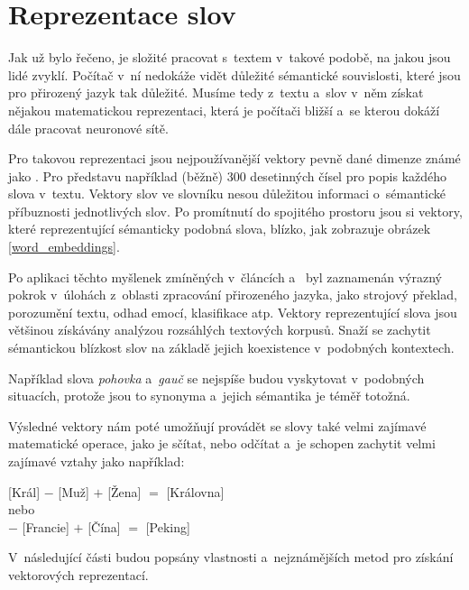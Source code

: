 \section{Reprezentace slov}
\label{reprezentace_slov}
Jak už bylo řečeno, je složité pracovat s~textem v~takové podobě, na jakou jsou lidé zvyklí. Počítač v~ní nedokáže vidět důležité sémantické souvislosti, které jsou pro přirozený jazyk tak důležité. Musíme tedy z~textu a~slov v~něm získat nějakou matematickou reprezentaci, která je počítači bližší a~se kterou dokáží dále pracovat neuronové sítě. \par
Pro takovou reprezentaci jsou nejpoužívanější vektory pevně dané dimenze známé jako . Pro představu například (běžně) 300 desetinných čísel pro popis každého slova v~textu. Vektory slov ve slovníku nesou důležitou informaci o~sémantické příbuznosti jednotlivých slov. Po promítnutí do spojitého prostoru jsou si vektory, které reprezentující sémanticky podobná slova, blízko, jak zobrazuje obrázek \ref{word_embeddings}.\par
Po aplikaci těchto myšlenek zmíněných v~článcích \cite{mikolov2013embeddings} a~\cite{mikolov2013_2} byl zaznamenán výrazný pokrok v~úlohách z~oblasti zpracování přirozeného jazyka, jako strojový překlad, porozumění textu, odhad emocí, klasifikace atp.
Vektory reprezentující slova jsou většinou získávány analýzou rozsáhlých textových korpusů. Snaží se zachytit sémantickou blízkost slov na základě jejich koexistence v~podobných kontextech.\par 
Například slova \emph{pohovka} a~\emph{gauč} se nejspíše budou vyskytovat v~podobných situacích, protože jsou to synonyma a~jejich sémantika je téměř totožná.\par
Výsledné vektory nám poté umožňují provádět se slovy také velmi zajímavé matematické operace, jako je sčítat, nebo odčítat a~je schopen zachytit velmi zajímavé vztahy jako například:
\begin{center}
[Král] $-$ [Muž] $+$ [Žena] $=$ [Královna]\\
\medskip
nebo\\
\medskip
[Paříž] $-$ [Francie] $+$ [Čína] $=$ [Peking]
\end{center}

V~následující části budou popsány vlastnosti a~nejznámějších metod pro získání vektorových reprezentací.

